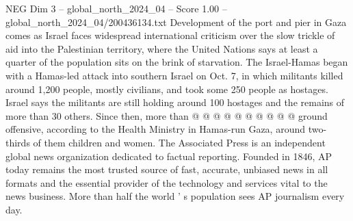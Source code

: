 \begin{textsample}{NEG Dim 3 – global\_north\_2024\_04 – Score 1.00 – global\_north\_2024\_04/200436134.txt}
Development of the port and pier in Gaza comes as Israel faces widespread international criticism over the slow trickle of aid into the Palestinian territory, where the United Nations says at least a quarter of the population sits on the brink of starvation.
The Israel-Hamas began with a Hamas-led attack into southern Israel on Oct. 7, in which militants killed around 1,200 people, mostly civilians, and took some 250 people as hostages.
Israel says the militants are still holding around 100 hostages and the remains of more than 30 others.
Since then, more than @ @ @ @ @ @ @ @ @ @ ground offensive, according to the Health Ministry in Hamas-run Gaza, around two-thirds of them children and women.
The Associated Press is an independent global news organization dedicated to factual reporting.
Founded in 1846, AP today remains the most trusted source of fast, accurate, unbiased news in all formats and the essential provider of the technology and services vital to the news business.
More than half the world ' s population sees AP journalism every day.

\end{textsample}
